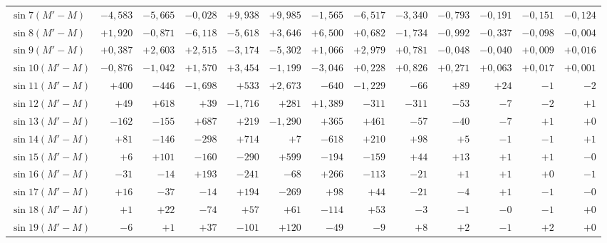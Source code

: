 \begin{landscape}
\begin{longtable}{@{}l|r|r|r|r|r|r|r|r|r|r|r|r@{}}
\(\sin 7(M'-M)\) & \(-4{,}583\) & \(-5{,}665\) & \(-0{,}028\) & \(+9{,}938\) & \(+9{,}985\) & \(-1{,}565\) & \(-6{,}517\) & \(-3{,}340\) & \(-0{,}793\) & \(-0{,}191\) & \(-0{,}151\) & \(-0{,}124\)\\
\(\sin 8(M'-M)\) & \(+1{,}920\) & \(-0{,}871\) & \(-6{,}118\) & \(-5{,}618\) & \(+3{,}646\) & \(+6{,}500\) & \(+0{,}682\) & \(-1{,}734\) & \(-0{,}992\) & \(-0{,}337\) & \(-0{,}098\) & \(-0{,}004\)\\
\(\sin 9(M'-M)\) & \(+0{,}387\) & \(+2{,}603\) & \(+2{,}515\) & \(-3{,}174\) & \(-5{,}302\) & \(+1{,}066\) & \(+2{,}979\) & \(+0{,}781\) & \(-0{,}048\) & \(-0{,}040\) & \(+0{,}009\) & \(+0{,}016\)\\
\(\sin 10(M'-M)\) & \(-0{,}876\) & \(-1{,}042\) & \(+1{,}570\) & \(+3{,}454\) & \(-1{,}199\) & \(-3{,}046\) & \(+0{,}228\) & \(+0{,}826\) & \(+0{,}271\) & \(+0{,}063\) & \(+0{,}017\) & \(+0{,}001\)\\
\(\sin 11(M'-M)\) & \(+400\) & \(-446\) & \(-1{,}698\) & \(+533\) & \(+2{,}673\) & \(-640\) & \(-1{,}229\) & \(-66\) & \(+89\) & \(+24\) & \(-1\) & \(-2\)\\
\(\sin 12(M'-M)\) & \(+49\) & \(+618\) & \(+39\) & \(-1{,}716\) & \(+281\) & \(+1{,}389\) & \(-311\) & \(-311\) & \(-53\) & \(-7\) & \(-2\) & \(+1\)\\
\(\sin 13(M'-M)\) & \(-162\) & \(-155\) & \(+687\) & \(+219\) & \(-1{,}290\) & \(+365\) & \(+461\) & \(-57\) & \(-40\) & \(-7\) & \(+1\) & \(+0\)\\
\(\sin 14(M'-M)\) & \(+81\) & \(-146\) & \(-298\) & \(+714\) & \(+7\) & \(-618\) & \(+210\) & \(+98\) & \(+5\) & \(-1\) & \(-1\) & \(+1\)\\
\(\sin 15(M'-M)\) & \(+6\) & \(+101\) & \(-160\) & \(-290\) & \(+599\) & \(-194\) & \(-159\) & \(+44\) & \(+13\) & \(+1\) & \(+1\) & \(-0\)\\
\(\sin 16(M'-M)\) & \(-31\) & \(-14\) & \(+193\) & \(-241\) & \(-68\) & \(+266\) & \(-113\) & \(-21\) & \(+1\) & \(+1\) & \(+0\) & \(-1\)\\
\(\sin 17(M'-M)\) & \(+16\) & \(-37\) & \(-14\) & \(+194\) & \(-269\) & \(+98\) & \(+44\) & \(-21\) & \(-4\) & \(+1\) & \(-1\) & \(-0\)\\
\(\sin 18(M'-M)\) & \(+1\) & \(+22\) & \(-74\) & \(+57\) & \(+61\) & \(-114\) & \(+53\) & \(-3\) & \(-1\) & \(-0\) & \(-1\) & \(+0\)\\
\(\sin 19(M'-M)\) & \(-6\) & \(+1\) & \(+37\) & \(-101\) & \(+120\) & \(-49\) & \(-9\) & \(+8\) & \(+2\) & \(-1\) & \(+2\) & \(+0\)\\

\end{longtable}
\end{landscape}
